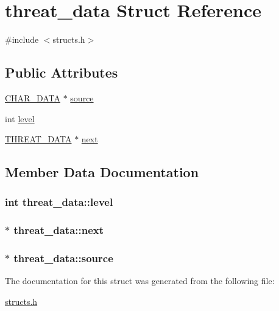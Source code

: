 \hypertarget{structthreat__data}{\section{threat\-\_\-data Struct Reference}
\label{structthreat__data}
}


{\ttfamily \#include $<$structs.\-h$>$}

\subsection*{Public Attributes}
\begin{DoxyCompactItemize}
\item 
\hyperlink{structs_8h_af33ed1e66e8541a08bed257124f50f31}{C\-H\-A\-R\-\_\-\-D\-A\-T\-A} $\ast$ \hyperlink{structthreat__data_ae95f97e186f4acfe7b4e589eeb67f621}{source}
\item 
int \hyperlink{structthreat__data_a38446b0fbc783c5219581f8c90d6bf4f}{level}
\item 
\hyperlink{structs_8h_aed0fe51c5cd01a7f8f46bdc898586ad8}{T\-H\-R\-E\-A\-T\-\_\-\-D\-A\-T\-A} $\ast$ \hyperlink{structthreat__data_a00ce1fcabee2023cd604cfe3084cbb59}{next}
\end{DoxyCompactItemize}


\subsection{Member Data Documentation}
\hypertarget{structthreat__data_a38446b0fbc783c5219581f8c90d6bf4f}{
\subsubsection[{level}]{\setlength{\rightskip}{0pt plus 5cm}int threat\-\_\-data\-::level}}\label{structthreat__data_a38446b0fbc783c5219581f8c90d6bf4f}
\hypertarget{structthreat__data_a00ce1fcabee2023cd604cfe3084cbb59}{
\subsubsection[{next}]{$\ast$ threat\-\_\-data\-::next}}\label{structthreat__data_a00ce1fcabee2023cd604cfe3084cbb59}
\hypertarget{structthreat__data_ae95f97e186f4acfe7b4e589eeb67f621}{
\subsubsection[{source}]{$\ast$ threat\-\_\-data\-::source}}\label{structthreat__data_ae95f97e186f4acfe7b4e589eeb67f621}


The documentation for this struct was generated from the following file\-:\begin{DoxyCompactItemize}
\item 
\hyperlink{structs_8h}{structs.\-h}\end{DoxyCompactItemize}
